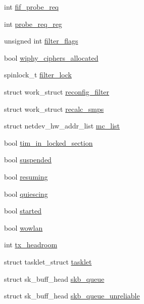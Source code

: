 \begin{DoxyCompactItemize}
\item 
int \hyperlink{structieee80211__local_ad3a2ffb279ac8ef26c6bb971b729cd73}{fif\-\_\-probe\-\_\-req}
\item 
int \hyperlink{structieee80211__local_ab293743371aeef9182e1e8c5be0d26f6}{probe\-\_\-req\-\_\-reg}
\item 
unsigned int \hyperlink{structieee80211__local_af57092f118989725a35071734086b077}{filter\-\_\-flags}
\item 
bool \hyperlink{structieee80211__local_a257c289b6a875f6028f1e79f4c0241bc}{wiphy\-\_\-ciphers\-\_\-allocated}
\item 
spinlock\-\_\-t \hyperlink{structieee80211__local_aa04ada770caf28109eee6faf56a43ee6}{filter\-\_\-lock}
\item 
struct work\-\_\-struct \hyperlink{structieee80211__local_aeebe638f6e2c04a7481951fee56b1c9e}{reconfig\-\_\-filter}
\item 
struct work\-\_\-struct \hyperlink{structieee80211__local_a1b89bbd9d7e4daee680c064bed613ff7}{recalc\-\_\-smps}
\item 
struct netdev\-\_\-hw\-\_\-addr\-\_\-list \hyperlink{structieee80211__local_a00dc9ea6f5dc07b551f8ae14dd3a4eff}{mc\-\_\-list}
\item 
bool \hyperlink{structieee80211__local_a34d7d9b6d74715302c953d01980bdebf}{tim\-\_\-in\-\_\-locked\-\_\-section}
\item 
bool \hyperlink{structieee80211__local_ae0ed5063d998fba626c0783a36391f3c}{suspended}
\item 
bool \hyperlink{structieee80211__local_a2ddb54f91088d41426fb0b5e4cb82022}{resuming}
\item 
bool \hyperlink{structieee80211__local_a4938b434be86b4b137b6eec047203e65}{quiescing}
\item 
bool \hyperlink{structieee80211__local_a43c08d193d555a2b2a61c53d2a4e5a63}{started}
\item 
bool \hyperlink{structieee80211__local_aafe36b77f629fe748f545f726849bb4c}{wowlan}
\item 
int \hyperlink{structieee80211__local_acf548b161496ab61ff27e8ae5aa59aff}{tx\-\_\-headroom}
\item 
struct tasklet\-\_\-struct \hyperlink{structieee80211__local_a4308a8fe6dfe7c223959f8b219a05695}{tasklet}
\item 
struct sk\-\_\-buff\-\_\-head \hyperlink{structieee80211__local_a6eeb93345e21d69a77a7c2c571bd0000}{skb\-\_\-queue}
\item 
struct sk\-\_\-buff\-\_\-head \hyperlink{structieee80211__local_a98b4c0b5fc65c583926a6c35981287eb}{skb\-\_\-queue\-\_\-unreliable}

\end{DoxyCompactItemize}
